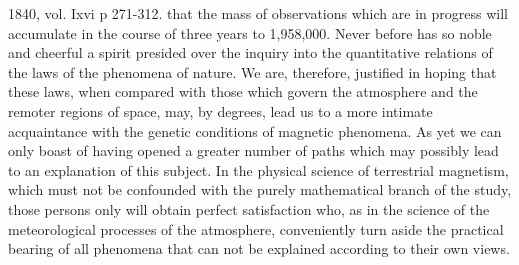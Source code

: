 {1840, vol. Ixvi p 271-312.} that the mass of observations which are in progress will accumulate in the course of three years to 1,958,000. Never before has so noble and cheerful a spirit presided over the inquiry into the quantitative relations of the laws of the phenomena of nature. We are, therefore, justified in hoping that these laws, when compared with those which govern the atmosphere and the remoter regions of space, may, by degrees, lead us to a more intimate acquaintance with the genetic conditions of magnetic phenomena. As yet we can only boast of having opened a greater number of paths which may possibly lead to an explanation of this subject. In the physical science of terrestrial magnetism, which must not be confounded with the purely mathematical branch of the study, those persons only will obtain perfect satisfaction who, as in the science of the meteorological processes of the atmosphere, conveniently turn aside the practical bearing of all phenomena that can not be explained according to their own views.
